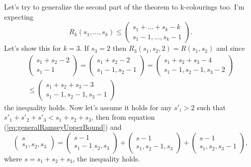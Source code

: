 Let's try to generalize the second part of the theorem to k-colourings too.
I'm expecting
\begin{equation}
    R_k(s_1,\dots,s_k) \leq
    \left(
    \begin{matrix}
        s_1+\dots+s_k-k \\
        s_1-1,\dots,s_k-1
    \end{matrix}
    \right) .
\end{equation}
Let's show this for $k=3$. If $s_3 = 2$ then $R_3(s_1,s_2,2) = R(s_1,s_2)$ and since
\begin{multline}
    \left(
    \begin{matrix}
        s_1+s_2-2 \\
        s_1-1
    \end{matrix}
    \right) =
    \left(
    \begin{matrix}
        s_1+s_2-2 \\
        s_1-1,s_2-1
    \end{matrix}
    \right)
    =
    \left(
    \begin{matrix}
        s_1+s_2+s_3-4 \\
        s_1-1,s_2-1,s_3-2
    \end{matrix}
    \right) \\
    \leq
    \left(
    \begin{matrix}
        s_1+s_2+s_3-3 \\
        s_1-1,s_2-1,s_3-1
    \end{matrix}
    \right)
    \nonumber
\end{multline}
the inequality holds.
Now let's assume it holds for any $s'_i > 2$ such that $s'_1+s'_2+s'_3 < s_1+s_2+s_3$, then from equation (\ref{eq:generalRamseyUpperBound}) and
\begin{equation}
    \left(
    \begin{matrix}
        s \\
        s_1,s_2,s_3
    \end{matrix}
    \right) =
    \left(
    \begin{matrix}
        s-1 \\
        s_1-1_,s_2,s_3
    \end{matrix}
    \right) +
    \left(
    \begin{matrix}
        s-1 \\
        s_1,s_2-1,s_3
    \end{matrix}
    \right) +
    \left(
    \begin{matrix}
        s-1 \\
        s_1,s_2,s_3-1
    \end{matrix}
    \right) , \nonumber
\end{equation}
where $s=s_1+s_2+s_3$, the inequality holds.